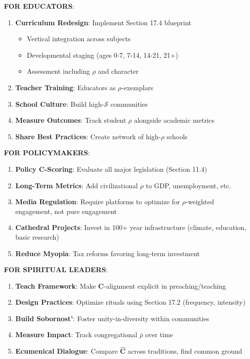 \documentclass[11pt,a4paper]{article}
\theoremstyle{definition}
\theoremstyle{remark}
\begin{document}
\begin{small}
\begin{enumerate}
\begin{protocol}
\begin{mdframed}[backgroundcolor=green!10,linewidth=2pt]
\textbf{FOR EDUCATORS}:
\begin{enumerate}
    \item \textbf{Curriculum Redesign}: Implement Section 17.4 blueprint
        \begin{itemize}[nosep]
            \item Vertical integration across subjects
            \item Developmental staging (ages 0-7, 7-14, 14-21, 21+)
            \item Assessment including \(\rho\) and character
        \end{itemize}
    \item \textbf{Teacher Training}: Educators as \(\rho\)-exemplars
    \item \textbf{School Culture}: Build high-\(\mathcal{S}\) communities
    \item \textbf{Measure Outcomes}: Track student \(\rho\) alongside academic metrics
    \item \textbf{Share Best Practices}: Create network of high-\(\rho\) schools
\end{enumerate}

\textbf{FOR POLICYMAKERS}:
\begin{enumerate}
    \item \textbf{Policy \(\mathbf{C}\)-Scoring}: Evaluate all major legislation (Section 11.4)
    \item \textbf{Long-Term Metrics}: Add civilizational \(\rho\) to GDP, unemployment, etc.
    \item \textbf{Media Regulation}: Require platforms to optimize for \(\rho\)-weighted engagement, not pure engagement
    \item \textbf{Cathedral Projects}: Invest in 100+ year infrastructure (climate, education, basic research)
    \item \textbf{Reduce Myopia}: Tax reforms favoring long-term investment
\end{enumerate}

\textbf{FOR SPIRITUAL LEADERS}:
\begin{enumerate}
    \item \textbf{Teach Framework}: Make \(\mathbf{C}\)-alignment explicit in preaching/teaching
    \item \textbf{Design Practices}: Optimize rituals using Section 17.2 (frequency, intensity)
    \item \textbf{Build Sobornost'}: Foster unity-in-diversity within communities
    \item \textbf{Measure Impact}: Track congregational \(\bar{\rho}\) over time
    \item \textbf{Ecumenical Dialogue}: Compare \(\hat{\mathbf{C}}\) across traditions, find common ground
\end{enumerate}
\end{mdframed}


\end{protocol}
\end{enumerate}
\end{small}
\end{document}
